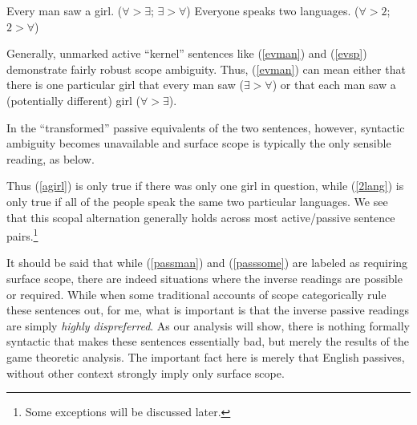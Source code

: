\documentclass{article}
\begin{document}
\begin{exe}
\ex\label{first}{\begin{xlist}
\ex Every man saw a girl. \hfill ($\forall > \exists$; $\exists >  \forall$)\label{evman}
\ex Everyone speaks two languages. \hfill ($\forall > 2$; $2 > \forall$)\label{evsp}
\end{xlist}}
\end{exe}

Generally, unmarked active ``kernel'' sentences like (\ref{evman}) and (\ref{evsp}) demonstrate fairly robust scope ambiguity.
Thus, (\ref{evman}) can mean either that there is one particular girl that every man saw ($\exists>\forall$) or that each man saw a (potentially different) girl ($\forall>\exists$).

In the ``transformed'' passive equivalents of the two sentences, however, syntactic ambiguity becomes unavailable and surface scope is typically the only sensible reading, as below.

\begin{exe}
\end{exe}

Thus (\ref{agirl}) is only true if there was only one girl in question, while (\ref{2lang}) is only true if all of the people speak the same two particular languages.
We see that this scopal alternation generally holds across most active/passive sentence pairs.\footnote{Some exceptions will be discussed later.}

It should be said that while (\ref{passman}) and (\ref{passsome}) are labeled as requiring surface scope, there are indeed situations where the inverse readings are possible or required.
While when some traditional accounts of scope categorically rule these sentences out, for me, what is important is that the inverse passive readings are simply \emph{highly dispreferred}.
As our analysis will show, there is nothing formally syntactic that makes these sentences essentially bad, but merely the results of the game theoretic analysis.
The important fact here is merely that English passives, without other context strongly imply only surface scope.
\end{document}
